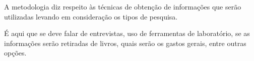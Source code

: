 A metodologia diz respeito às técnicas de obtenção de informações que serão utilizadas levando em consideração os tipos de pesquisa.

É aqui que se deve falar de entrevistas, uso de ferramentas de laboratório, se as informações serão retiradas de livros, quais serão os gastos gerais, entre outras opções.
